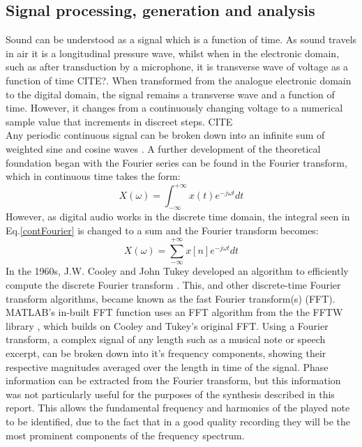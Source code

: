 \documentclass{article}
\begin{document}
    \subsection{Signal processing, generation and analysis}
        Sound can be understood as a signal which is a function of time.
        As sound travels in air it is a longitudinal pressure wave, whilst when in the electronic domain, such as after transduction by a microphone, it is transverse wave of voltage as a function of time CITE?.
        When transformed from the analogue electronic domain to the digital domain, the signal remains a transverse wave and a function of time.
        However, it changes from a continuously changing voltage to a numerical sample value that increments in discreet steps. CITE
        \\
        Any periodic continuous signal can be broken down into an infinite sum of weighted sine and cosine waves \cite{weisstein2004fourier}.
        A further development of the theoretical foundation began with the Fourier series can be found in the Fourier transform, which in continuous time takes the form:
        \begin{equation}
            X(\omega) = \int_{-\infty}^{+\infty}x(t)e^{-j\omega t}dt
            \label{contFourier}
        \end{equation}
        However, as digital audio works in the discrete time domain, the integral seen in Eq.\ref{contFourier} is changed to a sum and the Fourier transform becomes:
        \begin{equation}
            X(\omega) = \sum_{-\infty}^{+\infty}x[n]e^{-j\omega t}dt
        \end{equation}
        In the 1960s, J.W. Cooley and John Tukey developed an algorithm to efficiently compute the discrete Fourier transform \cite{cooley1965algorithm}.
        This, and other discrete-time Fourier transform algorithms, became known as the fast Fourier transform(s) (FFT).
        MATLAB's in-built FFT function uses an FFT algorithm from the the FFTW library \cite{frigo1998fftw}, which builds on Cooley and Tukey's original FFT.
        Using a Fourier transform, a complex signal of any length such as a musical note or speech excerpt, can be broken down into it's frequency components, showing their respective magnitudes averaged over the length in time of the signal.
        Phase information can be extracted from the Fourier transform, but this information was not particularly useful for the purposes of the synthesis described in this report.
        This allows the fundamental frequency and harmonics of the played note to be identified, due to the fact that in a good quality recording they will be the most prominent components of the frequency spectrum.
\end{document}
